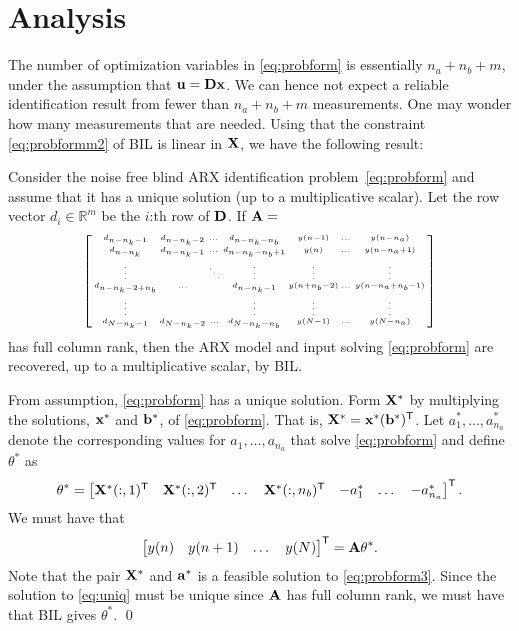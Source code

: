 \documentclass{ifacconf}
\newcommand{\T}{\mathsf{T}}
\newcommand{\xx}{{\bf x}}
\newcommand{\DD}{{\bf D}}
\newcommand{\bb}{{\bf b}}
\renewcommand{\aa}{{\bf a}}
\newcommand{\uu}{{\bf  u}}
\newcommand{\X}{{\bf X}}
\newcommand{\0}{{\bf 0}}
\renewcommand{\Re}{{\mathbb{R}}}
\begin{document}
\section{Analysis}
The number of optimization variables  in \eqref{eq:probform} is
essentially $n_a+n_b+m$, under the assumption that $\uu=\DD\xx$. We can
hence not expect a  reliable identification result from fewer than
$n_a+n_b+m$  measurements. One may wonder how many measurements that
are needed. Using that the constraint \eqref{eq:probformm2} of BIL is
linear in $\X$, we have the following result:
\begin{thm}\hfill


Consider the noise free blind ARX identification
problem~\eqref{eq:probform} and assume that it has a  unique solution
(up to a multiplicative scalar).
Let the row vector $d_i \in \Re^m$ be the $i$:th row of $\DD$. 
If  ${\bf A}=$
\begin{equation*}{\tiny
\left [\begin{smallmatrix}
d_{n-n_k-1} & d_{n-n_k-2} & \dots & d_{n-n_k-n_b} & y(n-1) & \dots & y(n-n_a)\\
d_{n-n_k}     & d_{n-n_k-1}        & \dots & d_{n-n_k-n_b+1} & y(n) & \dots & y(n-n_a+1)\\
\vdots &&\ddots &\vdots & \vdots &  & \vdots \\
d_{n-n_k-2+n_b } &\hdots &&d_{n-n_k-1} & y(n+n_b-2) & \dots & y(n-n_a+n_b-1)
\\
\vdots &&&\vdots & \vdots &  & \vdots
\\
d_{N-n_k-1} &d_{N-n_k-2}& \hdots &d_{N-n_k-n_b} & y(N-1) & \dots & y(N-n_a)
\end{smallmatrix} \right ]
}
\end{equation*}
has full column rank, then the ARX model and input solving
\eqref{eq:probform}  are recovered, up to
a multiplicative scalar, by BIL.
\end{thm}
\begin{pf}
From assumption, \eqref{eq:probform} has a unique solution. Form
$\X^*$ by multiplying the solutions, $\xx^*$ and $\bb^*$, of
\eqref{eq:probform}. That is,
$\X^*=\xx^* (\bb^*)^{\T}$. Let $a_1^*,\dots,a_{n_a}^*$ denote the
corresponding values for $a_1,\dots,a_{n_a}$ that solve
\eqref{eq:probform} and define $\theta^*$ as \begin{equation*}
\theta^*=\begin{bmatrix} \X^*(:,1)^{\T} & \X^*(:,2)^{\T} &\dots & \X^*(:,n_b)^{\T} &
  -a^*_1& \dots & -a^*_{n_a} \end{bmatrix}^{\T}.
\end{equation*} 
We must have that
 \begin{equation}\label{eq:uniq}
\begin{bmatrix} y(n) & y(n+1) & \dots & y(N) \end{bmatrix}^{\T}= {\bf A}
\theta^*. \end{equation}
Note that the pair $\X^*$ and $\aa^*$ is a feasible solution to \eqref{eq:probform3}.  Since the solution to \eqref{eq:uniq} must be  unique since ${\bf A}$
has full column rank, we must have that
BIL gives $\theta^*$. 
\qed
\end{pf}
\end{document}
